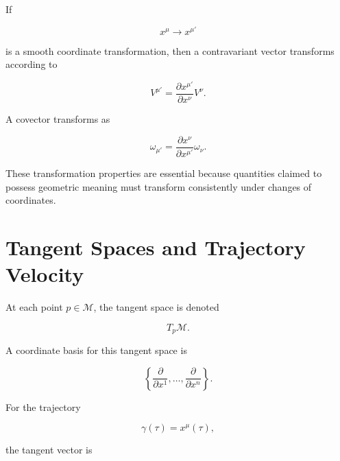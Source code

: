 \documentclass[12pt,oneside]{book}
\begin{document}
If

\begin{equation}
    x^\mu
    \longrightarrow
    x^{\mu'}
\end{equation}

is a smooth coordinate transformation, then a contravariant
vector transforms according to

\begin{equation}
    V^{\mu'}
    =
    \frac{\partial x^{\mu'}}
         {\partial x^\nu}
    V^\nu.
    \label{eq:vector-transformation}
\end{equation}

A covector transforms as

\begin{equation}
    \omega_{\mu'}
    =
    \frac{\partial x^\nu}
         {\partial x^{\mu'}}
    \omega_\nu.
    \label{eq:covector-transformation}
\end{equation}

These transformation properties are essential because quantities
claimed to possess geometric meaning must transform consistently
under changes of coordinates.


\section{Tangent Spaces and Trajectory Velocity}
\label{sec:tangent-spaces}

At each point \(p\in\mathcal{M}\), the tangent space is denoted

\begin{equation}
    T_p\mathcal{M}.
\end{equation}

A coordinate basis for this tangent space is

\begin{equation}
    \left\{
        \frac{\partial}{\partial x^1},
        \ldots,
        \frac{\partial}{\partial x^n}
    \right\}.
\end{equation}

For the trajectory

\begin{equation}
    \gamma(\tau)
    =
    x^\mu(\tau),
\end{equation}

the tangent vector is
\end{document}
